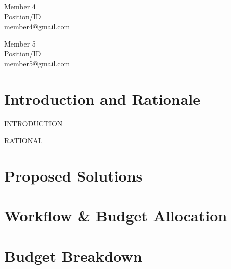 \documentclass[11pt]{article}
\begin{document}
\begin{titlepage}
\begin{center}
        \begin{minipage}[t]{0.3\textwidth}
            \begin{flushleft}
                Member 4 \\
                Position/ID \\
                member4@gmail.com
            \end{flushleft}
        \end{minipage}
        \begin{minipage}[t]{0.3\textwidth}
            \begin{flushright}
                Member 5 \\
                Position/ID \\
                member5@gmail.com
            \end{flushright}
        \end{minipage}
    \end{center}
    \vspace*{\fill} %
\end{titlepage}


\newpage
\clearpage
\vspace*{\fill}
\begin{center}
    \tableofcontents
\end{center}
\vspace*{\fill}
\clearpage


\section{Introduction and Rationale}

\vspace{0.3cm}

INTRODUCTION 

\vspace{0.3cm}

RATIONAL

\section{Proposed Solutions }


\newpage

\section{Workflow \& Budget Allocation}


\section{Budget Breakdown}
\end{document}
